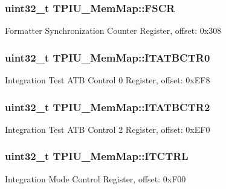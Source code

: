 \subsubsection[{F\+S\+C\+R}]{\setlength{\rightskip}{0pt plus 5cm}uint32\+\_\+t T\+P\+I\+U\+\_\+\+Mem\+Map\+::\+F\+S\+C\+R}\label{struct_t_p_i_u___mem_map_a86904c5ac326d4cca551c4fb45a9f9ba}
Formatter Synchronization Counter Register, offset\+: 0x308 \hypertarget{struct_t_p_i_u___mem_map_a1b09ee3aba38ca90fb73747e55d0f775}{}
\subsubsection[{I\+T\+A\+T\+B\+C\+T\+R0}]{\setlength{\rightskip}{0pt plus 5cm}uint32\+\_\+t T\+P\+I\+U\+\_\+\+Mem\+Map\+::\+I\+T\+A\+T\+B\+C\+T\+R0}\label{struct_t_p_i_u___mem_map_a1b09ee3aba38ca90fb73747e55d0f775}
Integration Test A\+T\+B Control 0 Register, offset\+: 0x\+E\+F8 \hypertarget{struct_t_p_i_u___mem_map_a1f6d13a29acd05c39533ebb6616cc67a}{}
\subsubsection[{I\+T\+A\+T\+B\+C\+T\+R2}]{\setlength{\rightskip}{0pt plus 5cm}uint32\+\_\+t T\+P\+I\+U\+\_\+\+Mem\+Map\+::\+I\+T\+A\+T\+B\+C\+T\+R2}\label{struct_t_p_i_u___mem_map_a1f6d13a29acd05c39533ebb6616cc67a}
Integration Test A\+T\+B Control 2 Register, offset\+: 0x\+E\+F0 \hypertarget{struct_t_p_i_u___mem_map_ac4619f833066fb015a2ff4679fd50fb5}{}
\subsubsection[{I\+T\+C\+T\+R\+L}]{\setlength{\rightskip}{0pt plus 5cm}uint32\+\_\+t T\+P\+I\+U\+\_\+\+Mem\+Map\+::\+I\+T\+C\+T\+R\+L}\label{struct_t_p_i_u___mem_map_ac4619f833066fb015a2ff4679fd50fb5}
Integration Mode Control Register, offset\+: 0x\+F00 \hypertarget{struct_t_p_i_u___mem_map_a8cf104c851fc40c954ff97ddff1d8d3b}{}
